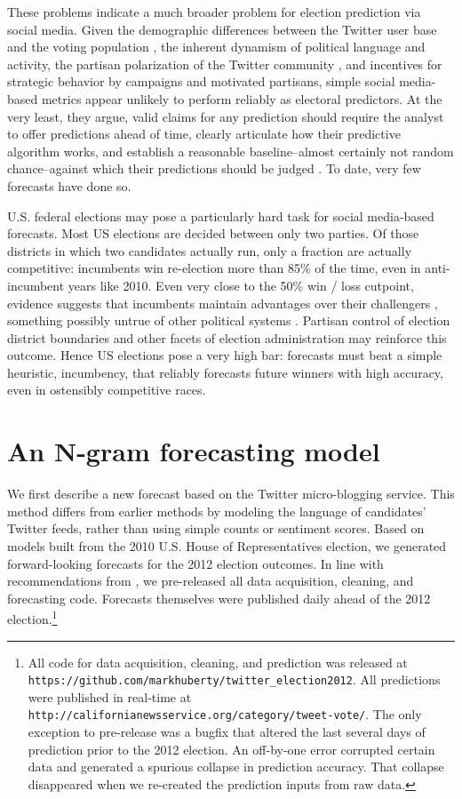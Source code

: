 \documentclass{sig-alternate-2013}
\begin{document}
These problems indicate a much broader problem for election prediction
via social media. Given the demographic
differences between the Twitter user base and the voting population
\cite{mislove2011understanding}, the inherent dynamism of political
language and activity, the partisan polarization of the Twitter
community \cite{conover2011}, and incentives for strategic behavior by
campaigns and motivated partisans, simple social media-based metrics appear unlikely
to perform reliably as electoral predictors. At the very least, they
argue, valid claims for any prediction should require the analyst to
offer predictions ahead of time, clearly articulate how their
predictive algorithm works, and establish a reasonable
baseline--almost certainly not random chance--against which their
predictions should be judged \cite{metaxas2011not}. To date, very few
forecasts have done so.

U.S. federal elections may pose a particularly hard task for social
media-based forecasts. Most US elections are decided between only two
parties. Of those districts in which two candidates actually run, only
a fraction are actually competitive: incumbents win re-election more
than 85\% of the time, even in anti-incumbent years like 2010. Even
very close to the 50\% win / loss cutpoint, evidence suggests that
incumbents maintain advantages over their challengers
\cite{caughey2011elections}, something possibly untrue of other
political systems \cite{eggers2013validity}. Partisan control of
election district boundaries and other facets of election
administration may reinforce this outcome. Hence US elections pose a
very high bar: forecasts must beat a simple heuristic, incumbency,
that reliably forecasts future winners with high accuracy, even in
ostensibly competitive races.

\section{An N-gram forecasting model}
\label{sec:multi-cycle-forecast}

We first describe a new forecast based on the Twitter micro-blogging
service. This method differs from earlier methods by 
modeling the language of candidates' Twitter feeds, rather than using
simple counts or sentiment scores. Based on models built from the 2010
U.S. House of Representatives election, we generated forward-looking
forecasts for the 2012 election outcomes. In line with recommendations
from \cite{metaxas2011not}, we pre-released all data acquisition,
cleaning, and forecasting code. Forecasts themselves were published
daily ahead of the 2012 election.\footnote{All code for data acquisition,
  cleaning, and prediction was released at
  \texttt{https://github.com/markhuberty/twitter\_election2012}. All
  predictions were published in real-time at
  \texttt{http://californianewsservice.org/category/tweet-vote/}. The
  only exception to pre-release was a bugfix that altered the last
  several days of prediction prior to the 2012 election. An off-by-one
  error corrupted certain data and generated a spurious collapse in
  prediction accuracy. That collapse disappeared when we re-created
  the prediction inputs from raw data.} 
\end{document}
